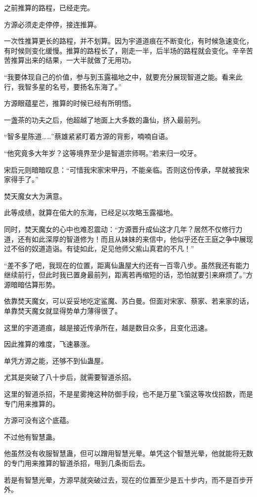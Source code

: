 \begin{this_body}
之前推算的路程，已经走完。

方源必须走走停停，接连推算。

一次性推算更长的路程，并不划算。因为宇道道痕在不断变化，有时候急速变化，有时候则变化缓慢。推算的路程长了，刚走一半，后半场的路程就会变化。辛辛苦苦推算出来的结果，一大半就做了无用功。

“我要体现自己的价值，参与到玉露福地之中，就要充分展现智道之能。看来此行，我智多星的名号，要扬名东海了。”

方源眼蕴星芒，推算的时候已经有所明悟。

一盏茶的功夫之后，他超越了地面上大多数的蛊仙，挤入最前列。

“智多星陈道……”蔡雄紧紧盯着方源的背影，喃喃自语。

“他究竟多大年岁？这等境界至少是智道宗师啊。”若来归一咬牙。

宋启元则暗暗叹息：“可惜我宋家宋甲丹，不能亲临。否则这份传承，早就被我宋家得手了。”

焚天魔女大为满意。

此等成绩，就算在偌大的东海，已经足以攻略玉露福地。

同时，焚天魔女的心中也难忍震动：“方源晋升成仙这才几年？居然不仅修行力道，还有如此深厚的智道修为！而且从妹妹的来信中，他似乎还在王庭之争中展现过不俗的奴道造诣。有徒如此，足见他师父紫山真君的不凡！”

“差不多了吧，我现在的位置，距离仙蛊屋大约还有一百零八步。虽然我还有能力继续前行，但此时我已置身最前列，距离若再缩短的话，恐怕就要引来麻烦了。”方源暗暗估算形势。

依靠焚天魔女，可以妥妥地吃定鲨魔、苏白曼。但面对宋家、蔡家、若来家的话，单靠焚天魔女就显得势单力薄得很了。

这里的宇道道痕，越是接近传承所在，越是数目众多，且变化迅速。

因此推算的难度，飞速暴涨。

单凭方源之能，还够不到仙蛊屋。

尤其是突破了八十步后，就需要智道杀招。

这里的智道杀招，不是星雾掩这种防御手段，也不是万星飞萤这等攻伐招数，而是专门用来推算的。

方源可没有这个底蕴。

不过他有智慧蛊。

他虽然没有收服智慧蛊，但可以蹭用智慧光晕。单凭这个智慧光晕，他就能将无数的专门用来推算的智道杀招，甩到几条街后去。

若是有智慧光晕，方源早就突破过去，现在的位置至少是五十步内，而不是百步开外。


\end{this_body}
